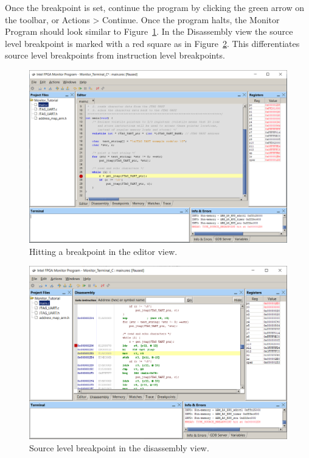 \documentclass[11pt, twoside, pdftex]{article}
\begin{document}
Once the breakpoint is set, continue the program by clicking the green arrow on the toolbar, or {\sf Actions > Continue}.
Once the program halts, the Monitor Program should look similar to Figure~\ref{fig:26}. In the Disassembly view the source level breakpoint 
is marked with a red square as in Figure~\ref{fig:27}. This differentiates source level breakpoints from instruction level breakpoints.\\

\begin{figure}[H]
   \begin{center}
      \includegraphics[scale=0.6]{screenshots/figure26.png}
   \end{center}
   \caption{Hitting a breakpoint in the editor view.}
	 \label{fig:26}
\end{figure}

\begin{figure}[H]
   \begin{center}
      \includegraphics[scale=0.6]{screenshots/figure27.png}
   \end{center}
   \caption{Source level breakpoint in the disassembly view.}
	 \label{fig:27}
\end{figure}
\end{document}
